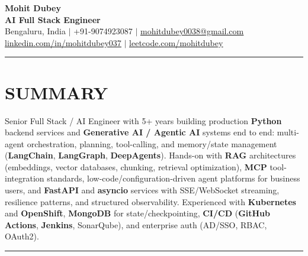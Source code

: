 \documentclass[a4paper]{article}
\newcommand{\sectionline}{
\begin{center}
\vspace{-9pt}
\rule{1\textwidth}{0.5pt}
\end{center}
\vspace{1pt}
}
\begin{document}
\begin{center}
    \textbf{\Huge Mohit Dubey} \\ \vspace{4pt}
    \textbf{AI Full Stack Engineer } \\ \vspace{6pt}
    \small Bengaluru, India $|$ +91-9074923087 $|$ \href{mailto:mohitdubey0038@gmail.com}{\underline{mohitdubey0038@gmail.com}} \\
    \href{https://www.linkedin.com/in/mohit-dubey-037/}{\underline{linkedin.com/in/mohitdubey037}} $|$ \href{https://leetcode.com/u/mohitdubey037/}
    {\underline{leetcode.com/mohitdubey}}
\end{center}


\sectionline
\section*{SUMMARY}
Senior Full Stack / AI Engineer with 5+ years building production \textbf{Python} backend services and \textbf{Generative AI / Agentic AI} systems end to end: multi-agent orchestration, planning, tool-calling, and memory/state management (\textbf{LangChain}, \textbf{LangGraph}, \textbf{DeepAgents}). Hands-on with \textbf{RAG} architectures (embeddings, vector databases, chunking, retrieval optimization), \textbf{MCP} tool-integration standards, low-code/configuration-driven agent platforms for business users, and \textbf{FastAPI} and \textbf{asyncio} services with SSE/WebSocket streaming, resilience patterns, and structured observability. Experienced with \textbf{Kubernetes} and \textbf{OpenShift}, \textbf{MongoDB} for state/checkpointing, \textbf{CI/CD} (\textbf{GitHub Actions}, \textbf{Jenkins}, SonarQube), and enterprise auth (AD/SSO, RBAC, OAuth2).

\sectionline
\end{document}
